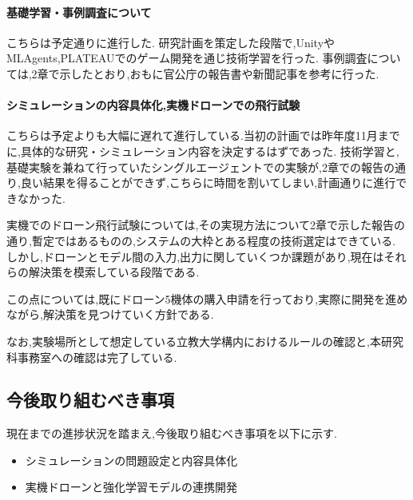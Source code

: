 \documentclass{article}[jsarticle]
\begin{document}
\paragraph{基礎学習・事例調査について}こちらは予定通りに進行した.
研究計画を策定した段階で,UnityやMLAgents,PLATEAUでのゲーム開発を通じ技術学習を行った.
事例調査については,2章で示したとおり,おもに官公庁の報告書や新聞記事を参考に行った.\par 
\paragraph{シミュレーションの内容具体化,実機ドローンでの飛行試験}
こちらは予定よりも大幅に遅れて進行している.当初の計画では昨年度11月までに,具体的な研究・シミュレーション内容を決定するはずであった.
技術学習と,基礎実験を兼ねて行っていたシングルエージェントでの実験が,2章での報告の通り,良い結果を得ることができず,こちらに時間を割いてしまい,計画通りに進行できなかった.\par 
実機でのドローン飛行試験については,その実現方法について2章で示した報告の通り,暫定ではあるものの,システムの大枠とある程度の技術選定はできている.
しかし,ドローンとモデル間の入力,出力に関していくつか課題があり,現在はそれらの解決策を模索している段階である.\par 
この点については,既にドローン5機体の購入申請を行っており,実際に開発を進めながら,解決策を見つけていく方針である.\par 
なお,実験場所として想定している立教大学構内におけるルールの確認と,本研究科事務室への確認は完了している.

\subsection{今後取り組むべき事項}
現在までの進捗状況を踏まえ,今後取り組むべき事項を以下に示す.
\begin{itemize}
    \item シミュレーションの問題設定と内容具体化
    \item 実機ドローンと強化学習モデルの連携開発
\end{itemize}
\end{document}

